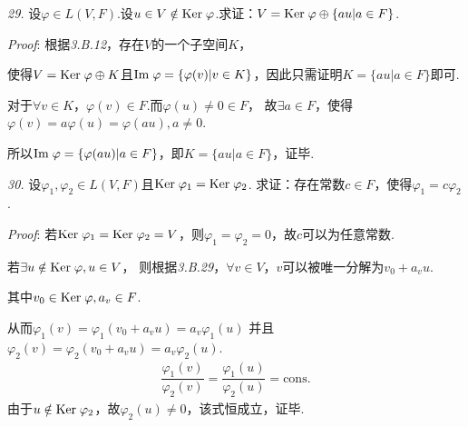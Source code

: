 \hspace*{\fill}

\textit{29.}
设\(\varphi \in L(V,F)\).设\(u \in V \notin \mathrm{Ker \;} \varphi\).求证：\(V=\mathrm{Ker \;} \varphi \oplus \{au|a \in F\}\).

\textit{Proof}:
根据\textit{3.B.12}，存在\(V\)的一个子空间\(K\)，

使得\(V=\mathrm{Ker \;} \varphi \oplus K\)且\(\mathrm{Im \;} \varphi=\{\varphi (v)|v \in K\}\)，因此只需证明\(K=\{au|a \in F\}\)即可.

对于\(\forall v \in K\)，\(\varphi(v) \in F\).而\(\varphi(u) \ne 0 \in F\)，
故\(\exists a \in F\)，使得\(\varphi(v)=a \varphi(u)=\varphi(au),a \ne 0\).

所以\(\mathrm{Im \;} \varphi=\{\varphi (au)|a \in F\}\)，即\(K=\{au|a \in F\}\)，证毕.

\hspace*{\fill}

\textit{30.}
设\(\varphi_1,\varphi_2 \in L(V,F)\)且\(\mathrm{Ker \;}  \varphi_1=\mathrm{Ker \;}  \varphi_2\).
求证：存在常数\(c \in F\)，使得\(\varphi_1=c \varphi_2\).

\textit{Proof}:
若\(\mathrm{Ker \;} \varphi_1=\mathrm{Ker \;} \varphi_2=V\)，则\(\varphi_1=\varphi_2=0\)，故\(c\)可以为任意常数.

若\(\exists u \notin \mathrm{Ker \;} \varphi,u \in V\)，
则根据\textit{3.B.29}，\(\forall v \in V\)，\(v\)可以被唯一分解为\(v_0+a_vu\).

其中\(v_0 \in \mathrm{Ker \;} \varphi,a_v \in F\).

从而\(\varphi_1(v)=\varphi_1(v_0+a_vu)=a_v \varphi_1(u)\)
并且\(\varphi_2(v)=\varphi_2(v_0+a_vu)=a_v \varphi_2(u)\).
    \begin{align*}
        \dfrac{\varphi_1(v)}{\varphi_2(v)}=\dfrac{\varphi_1(u)}{\varphi_2(u)}=\mathrm{cons.}
    \end{align*}
由于\(u \notin \mathrm{Ker \;} \varphi_2\)，故\(\varphi_2(u) \ne 0\)，该式恒成立，证毕.

